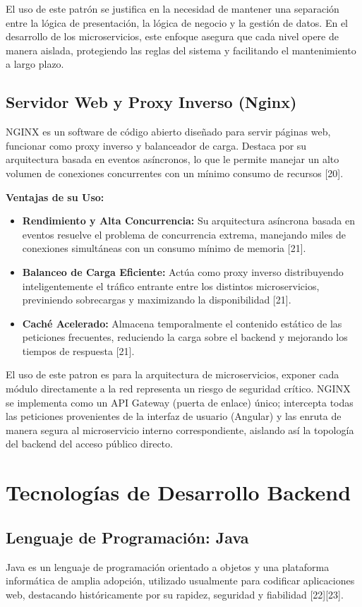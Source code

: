 El uso de este patrón se justifica en la necesidad de mantener una separación entre la lógica de presentación, la lógica de negocio y la gestión de datos.
En el desarrollo de los microservicios, este enfoque asegura que cada nivel opere de manera aislada, protegiendo las reglas del sistema y facilitando el mantenimiento a largo plazo.

\subsection{Servidor Web y Proxy Inverso (Nginx)}
NGINX es un software de código abierto diseñado para servir páginas web, funcionar como proxy inverso y balanceador de carga. Destaca por su arquitectura basada en eventos asíncronos, lo que le permite manejar un alto volumen de conexiones concurrentes con un mínimo consumo de recursos [20].

\textbf{Ventajas de su Uso:}
\begin{itemize}
    \item \textbf{Rendimiento y Alta Concurrencia:} Su arquitectura asíncrona basada en eventos resuelve el problema de concurrencia extrema, manejando miles de conexiones simultáneas con un consumo mínimo de memoria [21].
    \item \textbf{Balanceo de Carga Eficiente:} Actúa como proxy inverso distribuyendo inteligentemente el tráfico entrante entre los distintos microservicios, previniendo sobrecargas y maximizando la disponibilidad [21].
    \item \textbf{Caché Acelerado:} Almacena temporalmente el contenido estático de las peticiones frecuentes, reduciendo la carga sobre el backend y mejorando los tiempos de respuesta [21].
\end{itemize}

El uso de este patron es para la arquitectura de microservicios, exponer cada módulo directamente a la red representa un riesgo de seguridad crítico. NGINX se implementa como un API Gateway (puerta de enlace) único; intercepta todas las peticiones provenientes de la interfaz de usuario (Angular) y las enruta de manera segura al microservicio interno correspondiente, aislando así la topología del backend del acceso público directo.

\section{Tecnologías de Desarrollo Backend}
\subsection{Lenguaje de Programación: Java}
Java es un lenguaje de programación orientado a objetos y una plataforma informática de amplia adopción, utilizado usualmente para codificar aplicaciones web, destacando históricamente por su rapidez, seguridad y fiabilidad [22][23].

